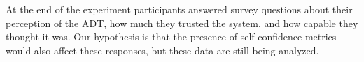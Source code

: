 At the end of the experiment participants answered survey questions about their perception of the ADT, how much they trusted the system, and how capable they thought it was. Our hypothesis is that the presence of self-confidence metrics would also affect these responses, but these data are still being analyzed.
